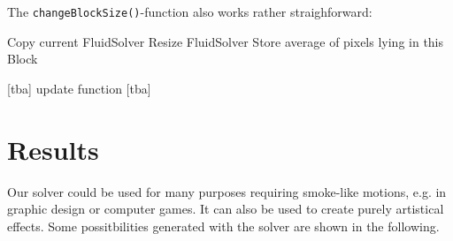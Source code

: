 \documentclass[a4paper,10pt,oneside,final,german,openbib,pdftex,titlepage]{scrbook}
\begin{document}
The \texttt{changeBlockSize()}-function also works rather straighforward:\medskip\\
%
\begin{function}[H]
\DontPrintSemicolon
{}
\Fn{\cBB{}}
{
	Copy current FluidSolver\;
	Resize FluidSolver\;
	{
		Store average of pixels lying in this Block\;
	}
	\nA{}\;
}
\end{function}
\hfill\medskip

[tba] update function [tba]
%
%
%
%
\chapter{Results}
Our solver could be used for many purposes requiring smoke-like motions, e.g. in graphic design or computer games. It can also be used to create purely artistical effects. Some possitbilities generated with the solver are shown in the following.\\
\end{document}
